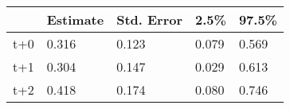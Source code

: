 \begin{tabular}{lllll}
  \toprule
  & Estimate & Std. Error & 2.5\% & 97.5\% \\ 
  \midrule
t+0 & 0.316 & 0.123 & 0.079 & 0.569 \\ 
  t+1 & 0.304 & 0.147 & 0.029 & 0.613 \\ 
  t+2 & 0.418 & 0.174 & 0.080 & 0.746 \\ 
   \bottomrule
\end{tabular}

